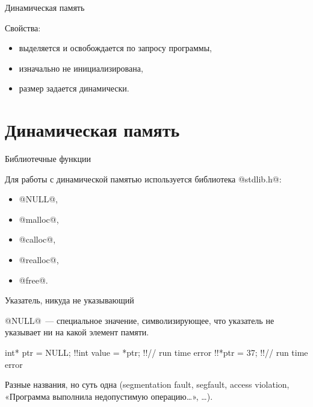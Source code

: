 \begin{frame}[fragile]{Динамическая память}


  \pause
  Свойства:
  \begin{itemize}
    \item выделяется и освобождается по запросу программы,
    \item изначально не инициализирована,
    \item размер задается динамически.
  \end{itemize}


\end{frame}

\section{Динамическая память}

\begin{frame}[fragile]{Библиотечные функции}

  Для работы с динамической памятью используется библиотека @stdlib.h@:
  \begin{itemize}
    \item @NULL@,
    \item @malloc@,
    \item @calloc@,
    \item @realloc@,
    \item @free@.
  \end{itemize}


\end{frame}

\begin{frame}[fragile]{Указатель, никуда не указывающий}

  @NULL@~--- специальное значение, символизирующее, что указатель не указывает
  ни на какой элемент памяти.

  \begin{clisting}[escapechar=\!]
    int* ptr = NULL;
    !!int value = *ptr; !!// run time error
    !!*ptr = 37; !!// run time error
  \end{clisting}

  Разные названия, но суть одна (segmentation fault, segfault, access
  violation, «Программа выполнила недопустимую операцию…», …).

\end{frame}

